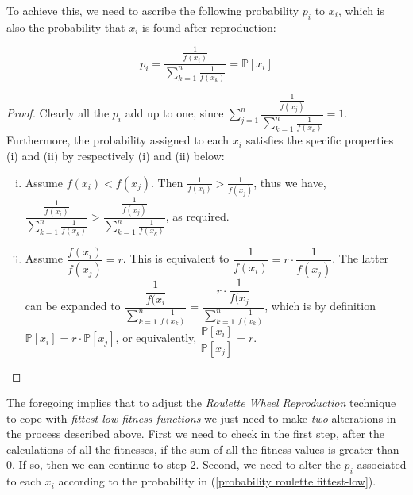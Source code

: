 \documentclass[a4paper]{article}
\newcommand{\Prob}[1]{\mathbb{P}[#1]}
\theoremstyle{dotless}
\begin{document}
To achieve this, we need to ascribe the following probability $p_i$ to $x_i$, which is also the probability that $x_i$ is found after reproduction:

\begin{equation}\label{probability roulette fittest-low}
p_i = \dfrac{\frac{1}{f(x_i)}}{\sum^n_{k=1} \frac{1}{f(x_k)}} = \Prob{x_i}
\end{equation}

\begin{proof} Clearly all the $p_i$ add up to one, since $\sum^n_{j=1} \dfrac{\frac{1}{f(x_j)}}{\sum^n_{k=1} \frac{1}{f(x_k)}} = 1$. Furthermore, the probability assigned to each $x_i$ satisfies the specific properties (i) and (ii) by respectively (i) and (ii) below:
\begin{enumerate}[(i)]
\item Assume $f(x_i) < f(x_j)$. Then $\frac{1}{f(x_i)} > \frac{1}{f(x_j)}$, thus we have, 
$\dfrac{\frac{1}{f(x_i)}}{\sum^n_{k=1} \frac{1}{f(x_k)}} > \dfrac{\frac{1}{f(x_j)}}{\sum^n_{k=1} \frac{1}{f(x_k)}}$, as required.
\item Assume $\dfrac{f(x_i)}{f(x_j)} = r$. This is equivalent to $\dfrac{1}{f(x_i)} = r \cdot \dfrac{1}{f(x_j)}$. The latter can be expanded to \linebreak $
\dfrac{\dfrac{1}{f(x_i}}{\sum^n_{k=1} \frac{1}{f(x_k)}} = \dfrac{r \cdot \dfrac{1}{f(x_j}}{\sum^n_{k=1} \frac{1}{f(x_k)}}$, which is by definition $\Prob{x_i} = r \cdot \Prob{x_j}$, or equivalently, $\dfrac{\Prob{x_i}}{\Prob{x_j}} = r$.
\end{enumerate}
\end{proof}

The foregoing implies that to adjust the \emph{Roulette Wheel  Reproduction} technique to cope with \emph{fittest-low fitness functions} we just need to make \textit{two} alterations in the process described above. First we need to check in the first step, after the calculations of all the fitnesses, if the sum of all the fitness values is greater than 0. If so, then we can continue to step 2. Second, we need to alter the $p_i$ associated to each $x_i$ according to the probability in (\ref{probability roulette fittest-low}).\\
\end{document}
